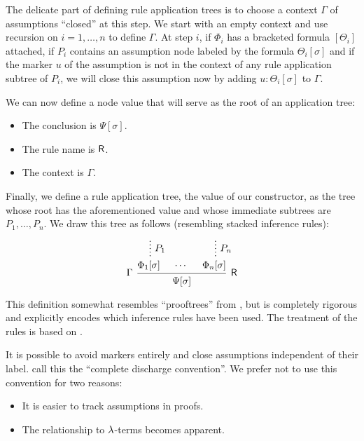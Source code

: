 \begin{definition}
\begin{thmenum}[resume=def:natural_deduction_proof_tree]
    The delicate part of defining rule application trees is to choose a context \( \Gamma \) of assumptions \enquote{closed} at this step. We start with an empty context and use recursion on \( i = 1, \ldots, n \) to define \( \Gamma \). At step \( i \), if \( \Phi_i \) has a bracketed formula \( [\Theta_i] \) attached, if \( P_i \) contains an assumption node labeled by the formula \( \Theta_i[\sigma] \) and if the marker \( u \) of the assumption is not in the context of any rule application subtree of \( P_i \), we will close this assumption now by adding \( u: \Theta_i[\sigma] \) to \( \Gamma \).

    We can now define a node value that will serve as the root of an application tree:
    \begin{itemize}
      \item The conclusion is \( \Psi[\sigma] \).
      \item The rule name is \( \textsf{R} \).
      \item The context is \( \Gamma \).
    \end{itemize}

    Finally, we define a rule application tree, the value of our constructor, as the tree whose root has the aforementioned value and whose immediate subtrees are \( P_1, \ldots, P_n \). We draw this tree as follows (resembling stacked inference rules):
    \begin{equation*}
      \begin{prooftree}
        \hypo{}
        \ellipsis { \( P_1 \) } { \Phi_1[\sigma] }

        \hypo{ \cdots }

        \hypo{}
        \ellipsis { \( P_n \) } { \Phi_n[\sigma] }
        \infer[left label=\( \Gamma \)]3[\logic{R}]{ \Psi[\sigma] }
      \end{prooftree}
    \end{equation*}
  \end{thmenum}
\end{definition}
\begin{comments}
  \item This definition somewhat resembles \enquote{prooftrees} from , but is completely rigorous and explicitly encodes which inference rules have been used. The treatment of the rules is based on .
  \item It is possible to avoid markers entirely and close assumptions independent of their label.  call this the \enquote{complete discharge convention}. We prefer not to use this convention for two reasons:
  \begin{itemize}
    \item It is easier to track assumptions in proofs.
    \item The relationship to \( \mathrm{\lambda} \)-terms becomes apparent.
  \end{itemize}
\end{comments}

